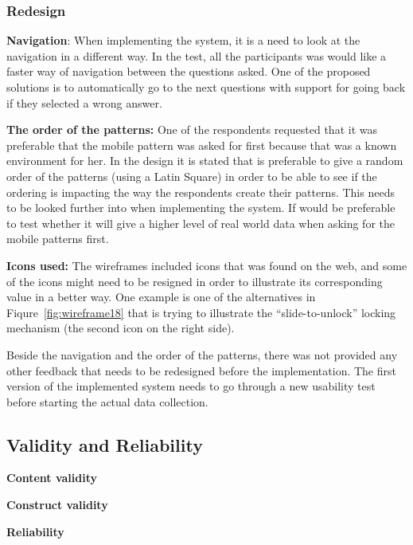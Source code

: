   \subsubsection*{Redesign}

  {\bf Navigation}: When implementing the system, it is a need to look at the navigation in a different way. In the test, all the participants was would like a faster way of navigation between the questions asked. One of the proposed solutions is to automatically go to the next questions with support for going back if they selected a wrong answer.

  {\bf The order of the patterns:} One of the respondents requested that it was preferable that the mobile pattern was asked for first because that was a known environment for her. In the design it is stated that is preferable to give a random order of the patterns (using a Latin Square) in order to be able to see if the ordering is impacting the way the respondents create their patterns. This needs to be looked further into when implementing the system. If would be preferable to test whether it will give a higher level of real world data when asking for the mobile patterns first. 

  {\bf Icons used:} The wireframes included icons that was found on the web, and some of the icons might need to be resigned in order to illustrate its corresponding value in a better way. One example is one of the alternatives in Fiqure~\ref{fig:wireframe18} that is trying to illustrate the ``slide-to-unlock'' locking mechanism (the second icon on the right side).

  Beside the navigation and the order of the patterns, there was not provided any other feedback that needs to be redesigned before the implementation. The first version of the implemented system needs to go through a new usability test before starting the actual data collection. 


  \subsection{Validity and Reliability}\label{sec:validityandreliability}

    {\bf Content validity}

    {\bf Construct validity}

    {\bf Reliability}